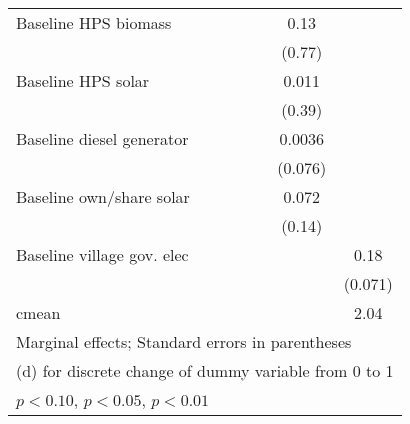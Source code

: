 \begin{table}[htbp]
\begin{tabular*}{1\hsize}{@{\hskip\tabcolsep\extracolsep\fill}l*{6}{c}}
Baseline HPS biomass&                  &                  &                  &                  &     0.13         &                  \\
                &                  &                  &                  &                  &   (0.77)         &                  \\
Baseline HPS solar&                  &                  &                  &                  &    0.011         &                  \\
                &                  &                  &                  &                  &   (0.39)         &                  \\
Baseline diesel generator&                  &                  &                  &                  &   0.0036         &                  \\
                &                  &                  &                  &                  &  (0.076)         &                  \\
Baseline own/share solar&                  &                  &                  &                  &    0.072         &                  \\
                &                  &                  &                  &                  &   (0.14)         &                  \\
Baseline village gov. elec&                  &                  &                  &                  &                  &     0.18\sym{**} \\
                &                  &                  &                  &                  &                  &  (0.071)         \\
\midrule
cmean           &                  &                  &                  &                  &                  &     2.04         \\
\bottomrule
\multicolumn{7}{l}{\footnotesize Marginal effects; Standard errors in parentheses}\\
\multicolumn{7}{l}{\footnotesize  (d) for discrete change of dummy variable from 0 to 1}\\
\multicolumn{7}{l}{\footnotesize \sym{*} \(p<0.10\), \sym{**} \(p<0.05\), \sym{***} \(p<0.01\)}\\
\end{tabular*}
\end{table}

